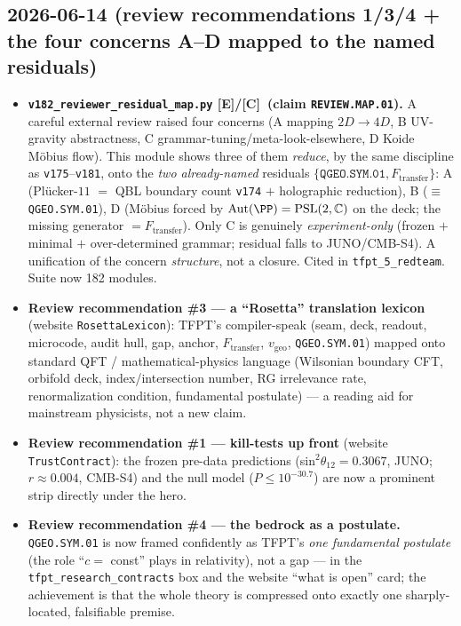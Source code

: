 \documentclass[11pt]{article}
\providecommand{\mE}{\textbf{[E]}}\providecommand{\mC}{\textbf{[C]}}
\providecommand{\vref}[1]{\texttt{#1}}
\begin{document}
\subsection*{2026-06-14 (review recommendations 1/3/4 + the four concerns A--D mapped to the named residuals)}
\begin{itemize}
\item \textbf{\texttt{v182\_reviewer\_residual\_map.py} \mE/\mC\ (claim \texttt{REVIEW.MAP.01}).} A
  careful external review raised four concerns (A mapping $2D\!\to\!4D$, B UV-gravity abstractness,
  C grammar-tuning/meta-look-elsewhere, D Koide M\"obius flow). This module shows three of them
  \emph{reduce}, by the same discipline as \vref{v175}--\vref{v181}, onto the \emph{two already-named}
  residuals $\{\texttt{QGEO.SYM.01},F_{\mathrm{transfer}}\}$: A (Pl\"ucker-$11$ $=$ QBL boundary count
  \vref{v174} $+$ holographic reduction), B ($\equiv$ \texttt{QGEO.SYM.01}), D (M\"obius forced by
  $\mathrm{Aut}(\PP)=\mathrm{PSL}(2,\mathbb C)$ on the deck; the missing generator $=F_{\mathrm{transfer}}$).
  Only C is genuinely \emph{experiment-only} (frozen $+$ minimal $+$ over-determined grammar; residual
  falls to JUNO/CMB-S4). A unification of the concern \emph{structure}, not a closure. Cited in
  \texttt{tfpt\_5\_redteam}. Suite now 182 modules.
\item \textbf{Review recommendation \#3 --- a ``Rosetta'' translation lexicon} (website
  \texttt{RosettaLexicon}): TFPT's compiler-speak (seam, deck, readout, microcode, audit hull, gap,
  anchor, $F_{\mathrm{transfer}}$, $v_{\mathrm{geo}}$, \texttt{QGEO.SYM.01}) mapped onto standard QFT /
  mathematical-physics language (Wilsonian boundary CFT, orbifold deck, index/intersection number, RG
  irrelevance rate, renormalization condition, fundamental postulate) --- a reading aid for
  mainstream physicists, not a new claim.
\item \textbf{Review recommendation \#1 --- kill-tests up front} (website \texttt{TrustContract}): the
  frozen pre-data predictions (sin$^2\theta_{12}=0.3067$, JUNO; $r\approx0.004$, CMB-S4) and the null
  model ($P\le10^{-30.7}$) are now a prominent strip directly under the hero.
\item \textbf{Review recommendation \#4 --- the bedrock as a postulate.} \texttt{QGEO.SYM.01} is now
  framed confidently as TFPT's \emph{one fundamental postulate} (the role ``$c=$ const'' plays in
  relativity), not a gap --- in the \texttt{tfpt\_research\_contracts} box and the website ``what is
  open'' card; the achievement is that the whole theory is compressed onto exactly one sharply-located,
  falsifiable premise.
\end{itemize}
\end{document}
